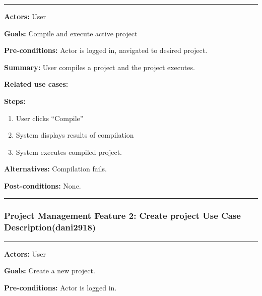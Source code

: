 \documentclass[twoside,letterpaper]{article}
\begin{document}
	
	\bigskip
	\vspace{2pt}
	\hrule
	\vspace{8pt}
	 \textbf{Actors:} User \newline
	 
	\noindent \textbf{Goals:} Compile and execute active project\newline
	
	 \noindent \textbf{Pre-conditions:} Actor is logged in, navigated to desired project.  \newline
	 
	\noindent \textbf{Summary:} User compiles a project and the project executes.\newline
	
	\noindent \textbf{Related use cases:} \newline
	
	\noindent \textbf{Steps:} \begin{enumerate}
	  \item User clicks ``Compile''
	  \item System displays results of compilation
	  \item System executes compiled project.
	 \end{enumerate}
	 \noindent \textbf{Alternatives:} Compilation fails. \newline
	 
	\noindent  \textbf{Post-conditions:} None. \newline
	 
	\vspace{8pt}
	\hrule
	\vspace{20pt}
	\newpage


	\subsubsection[Project Management Feature 2: Create project Use Case Description (dani2918)]{\rmfamily\bfseries\color{black}
		Project Management Feature 2: Create project Use Case Description(dani2918)}
	\hypertarget{RefHeading22059017292}{}
	\label{pm:uc3}
	\bigskip
	
	\vspace{2pt}
	\hrule
	\vspace{8pt}
	 \noindent \textbf{Actors:} User \newline
	 
	 \noindent \textbf{Goals:} Create a new project. \newline
	 
	 \noindent  \textbf{Pre-conditions:} Actor is logged in.  \newline
	 
\end{document}
